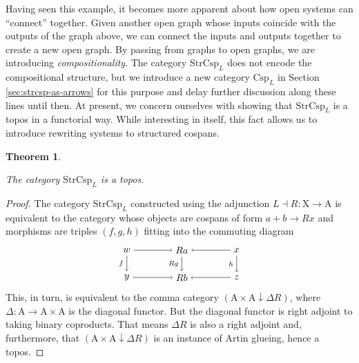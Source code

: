 \documentclass{amsart}
\newcommand{\A}{\cat{A}}
\newcommand{\X}{\cat{X}}
\newcommand{\Csp}{\cat{Csp}}
\newcommand{\StrCsp}{\cat{StrCsp}}
\newcommand{\cat}[1]{\mathrm{#1}}
\newcommand{\from}{\colon}
\newcommand{\csp}[3]{#1 + #3 \to #2}
\newtheorem{theorem}{Theorem}[section]
\theoremstyle{remark}
\theoremstyle{definition}
\begin{document}

Having seen this example, it becomes more apparent about how open
systems can ``connect'' together. Given another open graph whose inputs
coincide with the outputs of the graph above, we can connect
the inputs and outputs together to create a new open graph. By passing
from graphs to open graphs, we are introducing
\emph{compositionality}. The category $ \StrCsp_{L} $ does not encode
the compositional structure, but we introduce a new category
$ \Csp_L $ in Section \ref{sec:strcsp-as-arrows} for this purpose
and delay further discussion along these lines until then. At present,
we concern ourselves with showing that $ \StrCsp_L $ is a topos in a
functorial way.  While interesting in itself, this fact allows us to
introduce rewriting systems to structured cospans.


\begin{theorem} \label{thm:strcsp-istopos}

  The category $ \StrCsp_L $ is a topos.
  
\end{theorem}

\begin{proof}

  The category $ \StrCsp_L $ constructed using the adjunction
  $ L \dashv R \from \X \to \A $ is equivalent to the category
  whose objects are cospans of form
  \(
      \csp{a}{Rx}{b}
  \)
  and morphisms are triples $ ( f,g,h ) $ fitting into the commuting
  diagram
  \[
    \begin{tikzpicture}
      \node (1) at (-2,1) {\( w \)};
      \node (2) at (0,1) {\( Ra \)};
      \node (3) at (2,1) {\( x \)};
      \node (4) at (-2,0) {\( y \)};
      \node (5) at (0,0) {\( Rb \)};
      \node (6) at (2,0) {\( z \)};
      \draw [->] (1) to  node [] {\scriptsize{\(  \)}} (2);
      \draw [->] (3) to node [] {\scriptsize{\(  \)}} (2);
      \draw [->] (4) to node [] {\scriptsize{\(  \)}} (5);
      \draw [->] (6) to node [] {\scriptsize{\(  \)}} (5);
      \draw [->] (1) to node [left] {\scriptsize{\( f \)}} (4);
      \draw [->] (2) to node [left] {\scriptsize{\( Rg \)}} (5);
      \draw [->] (3) to node [left] {\scriptsize{\( h \)}} (6); 
    \end{tikzpicture}
  \]
  This, in turn, is equivalent to the comma category
  $ ( \A \times \A \downarrow \Delta R ) $, where
  $ \Delta \from \A \to \A \times \A $ is the diagonal functor. But
  the diagonal functor is right adjoint to taking binary
  coproducts. That means $ \Delta R $ is also a right adjoint and,
  furthermore, that $ ( \A \times \A \downarrow \Delta R ) $ is an
  instance of Artin glueing,
  hence a topos.
%
\end{proof}
\end{document}
